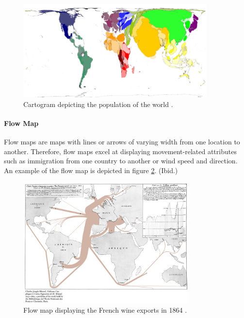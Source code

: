 \begin{figure}[htbp]
  \begin{center}
    \includegraphics[width=10cm]{images/cartogram-example.png}
    \caption{Cartogram depicting the population of the world \citep{hennig_population_2014}.}
    \label{fig:cartogram}
  \end{center}
\end{figure}

\paragraph{Flow Map}

Flow maps are maps with lines or arrows of varying width from one location to another. Therefore, flow maps excel at displaying movement-related attributes such as immigration from one country to another or wind speed and direction. An example of the flow map is depicted in figure \ref{fig:flow}. (Ibid.)

\begin{figure}[htbp]
  \begin{center}
    \includegraphics[width=9cm]{images/flow-example.jpg}
    \caption{Flow map displaying the French wine exports in 1864 \citep{minard_carte_1865}.}
    \label{fig:flow}
  \end{center}
\end{figure}

